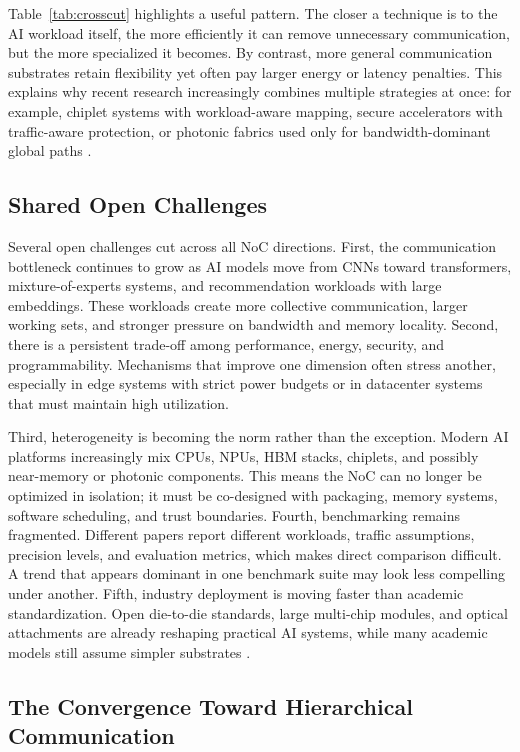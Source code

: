 Table~\ref{tab:crosscut} highlights a useful pattern. The closer a technique is to the AI workload itself, the more efficiently it can remove unnecessary communication, but the more specialized it becomes. By contrast, more general communication substrates retain flexibility yet often pay larger energy or latency penalties. This explains why recent research increasingly combines multiple strategies at once: for example, chiplet systems with workload-aware mapping, secure accelerators with traffic-aware protection, or photonic fabrics used only for bandwidth-dominant global paths \cite{jouppi2023tpuv4,ucie2024spec,weerasena2024security}.

\subsection{Shared Open Challenges}

Several open challenges cut across all NoC directions. First, the communication bottleneck continues to grow as AI models move from CNNs toward transformers, mixture-of-experts systems, and recommendation workloads with large embeddings. These workloads create more collective communication, larger working sets, and stronger pressure on bandwidth and memory locality. Second, there is a persistent trade-off among performance, energy, security, and programmability. Mechanisms that improve one dimension often stress another, especially in edge systems with strict power budgets or in datacenter systems that must maintain high utilization.

Third, heterogeneity is becoming the norm rather than the exception. Modern AI platforms increasingly mix CPUs, NPUs, HBM stacks, chiplets, and possibly near-memory or photonic components. This means the NoC can no longer be optimized in isolation; it must be co-designed with packaging, memory systems, software scheduling, and trust boundaries. Fourth, benchmarking remains fragmented. Different papers report different workloads, traffic assumptions, precision levels, and evaluation metrics, which makes direct comparison difficult. A trend that appears dominant in one benchmark suite may look less compelling under another. Fifth, industry deployment is moving faster than academic standardization. Open die-to-die standards, large multi-chip modules, and optical attachments are already reshaping practical AI systems, while many academic models still assume simpler substrates \cite{yin2024review,weerasena2024security}.

\subsection{The Convergence Toward Hierarchical Communication}


